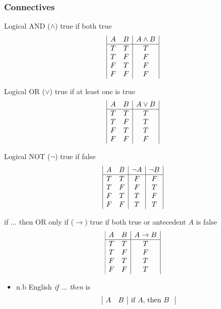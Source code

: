 \subsubsection{Connectives}
\begin{enumdescription}
	\item[Logical AND ($\land$)] true if both true
	\[
		\begin{array}{|c c|c|}
			A & B & A \land B \\
			\hline
			T & T & T         \\
			T & F & F         \\
			F & T & F         \\
			F & F & F
		\end{array}
	\]
	\item[Logical OR ($\lor$)] true if at least one is true
	\[
		\begin{array}{|c c|c|}
			A & B & A \lor B \\
			\hline
			T & T & T        \\
			T & F & T        \\
			F & T & T        \\
			F & F & F
		\end{array}
	\]
	\item[Logical NOT ($\lnot$)] true if false
	\[
		\begin{array}{|c c|c|c|}
			A & B & \lnot A & \lnot B \\
			\hline
			T & T & F       & F       \\
			T & F & F       & T       \\
			F & T & T       & F       \\
			F & F & T       & T
		\end{array}
	\]
	\item[if $\dots$ then OR only if ($\to$)] true if both true or antecedent
	$A$ is false
	\[
		\begin{array}{|c c|c|}
			A & B & A \to B \\
			\hline
			T & T & T       \\
			T & F & F       \\
			F & T & T       \\
			F & F & T
		\end{array}
	\]
	\begin{itemize}
		\item n.b English \textit{if $\dots$ then} is
		      \[
			      \begin{array}{|c c|c|}
				      A & B & \text{if $A$, then $B$ } \\

\end{array}\]
\end{itemize}
\end{enumdescription}
